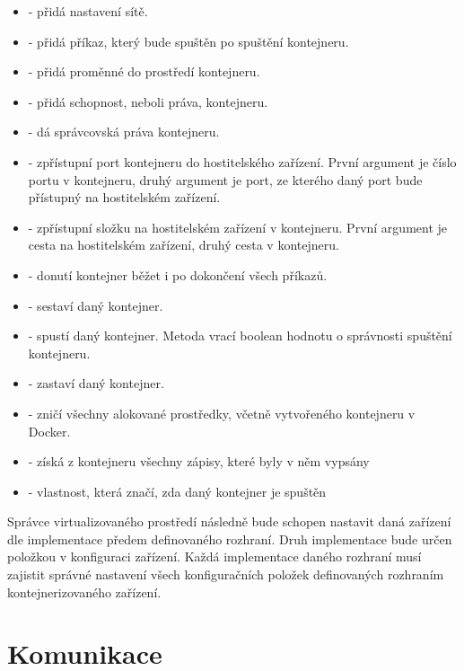 \begin{itemize}
    \item {} - přidá nastavení sítě.
    \item {} - přidá příkaz, který bude spuštěn po spuštění kontejneru.
    \item {} - přidá proměnné do prostředí kontejneru.
    \item {} - přidá schopnost, neboli práva, kontejneru.
    \item {} - dá správcovská práva kontejneru.
    \item {} - zpřístupní port kontejneru do hostitelského zařízení. První argument je číslo portu v kontejneru, druhý argument je port, ze kterého daný port bude přístupný na hostitelském zařízení. 
    \item {} - zpřístupní složku na hostitelském zařízení v kontejneru. První argument je cesta na hostitelském zařízení, druhý cesta v kontejneru.
    \item {} - donutí kontejner běžet i po dokončení všech příkazů.
    \item {} - sestaví daný kontejner.
    \item {} - spustí daný kontejner. Metoda vrací boolean hodnotu o správnosti spuštění kontejneru.
    \item {} - zastaví daný kontejner.
    \item {} - zničí všechny alokované prostředky, včetně vytvořeného kontejneru v Docker.
    \item {} - získá z kontejneru všechny zápisy, které byly v něm vypsány
    \item {} - vlastnost, která značí, zda daný kontejner je spuštěn
\end{itemize}

Správce virtualizovaného prostředí následně bude schopen nastavit daná zařízení dle implementace předem definovaného rozhraní. Druh implementace bude určen položkou  v konfiguraci zařízení. Každá implementace daného rozhraní musí zajistit správné nastavení všech konfiguračních položek definovaných rozhraním kontejnerizovaného zařízení.

\section{Komunikace}

